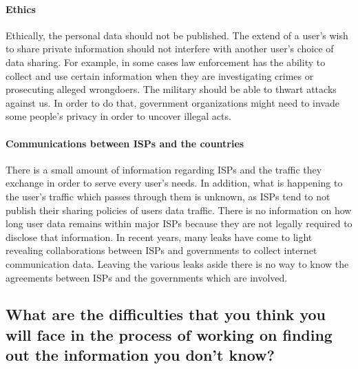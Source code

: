 \paragraph{Ethics\\}
Ethically, the personal data should not be published. The extend of a user's 
wish to share private information should not interfere with another user's 
choice of data sharing. For example, in some cases law enforcement has the 
ability to collect and use certain information when they are investigating 
crimes or prosecuting alleged wrongdoers. The military  should  be able to 
thwart attacks against us. In order to do that, government organizations might 
need to invade some people's privacy in order to uncover illegal acts. 


\paragraph{Communications between ISPs and the countries\\}
There is a small amount of information regarding ISPs and the traffic they 
exchange in order to serve every user's needs. In addition, what is happening to
the user's traffic which passes through them is unknown, as ISPs tend to not 
publish their sharing policies of users data traffic. There is no information on 
how long user data remains within major ISPs because they are not legally 
required to disclose that information. In recent years, many leaks have come to 
light revealing collaborations between ISPs and governments to collect internet 
communication data. Leaving the various leaks aside there is no way to know the 
agreements between ISPs and the governments which are involved. 


\vspace{1cm}
\subsection{What are the difficulties that you think you will face in the 
process of working on finding out the information you don't know?}
\vspace{0.7cm}

